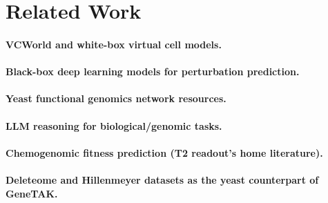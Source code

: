 \section{Related Work}

\paragraph{VCWorld and white-box virtual cell models.}

\paragraph{Black-box deep learning models for perturbation prediction.}

\paragraph{Yeast functional genomics network resources.}

\paragraph{LLM reasoning for biological/genomic tasks.}

\paragraph{Chemogenomic fitness prediction (T2 readout's home literature).}

\paragraph{Deleteome and Hillenmeyer datasets as the yeast counterpart of GeneTAK.}
